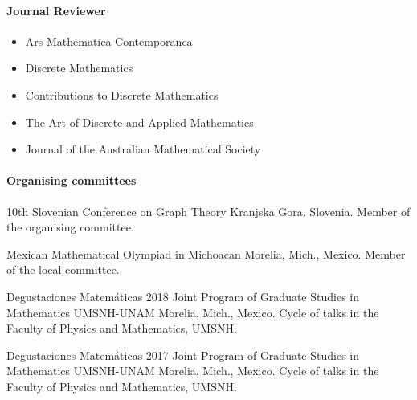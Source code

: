 \paragraph{Journal Reviewer}
  \begin{itemize}
		\item{Ars Mathematica Contemporanea}
		\item{Discrete Mathematics}
		\item{Contributions to Discrete Mathematics}
		\item{The Art of Discrete and Applied Mathematics}
		\item{Journal of the Australian Mathematical Society}
  \end{itemize}

  \paragraph{Organising committees} \leavevmode
  
	  {
	  {10th Slovenian Conference on Graph Theory}%
	  }
	  {}
	  {
	  {Kranjska Gora, Slovenia.}%
	  }
	  {}
	  {
	  {Member of the organising committee.}%
	  }

	  {
	  {Mexican Mathematical Olympiad in Michoacan}%
	  }
	  {}
	  {
	  {Morelia, Mich., Mexico.}%
	  }
	  {}
	  {
	  {Member of the local committee.}%
	  }

    {Degustaciones Matemáticas 2018}
    {
    {Joint Program of Graduate Studies in Mathematics UMSNH-UNAM}%
    }
    {
    {Morelia, Mich., Mexico.}%
    }
    {}
    {
    {Cycle of talks in the Faculty of Physics and Mathematics, UMSNH.}%
    }

    {Degustaciones Matemáticas 2017}
    {
    {Joint Program of Graduate Studies in Mathematics UMSNH-UNAM}%
    }
    {
    {Morelia, Mich., Mexico.}%
    }
    {}
    {
    {Cycle of talks in the Faculty of Physics and Mathematics, UMSNH.}%
    }

